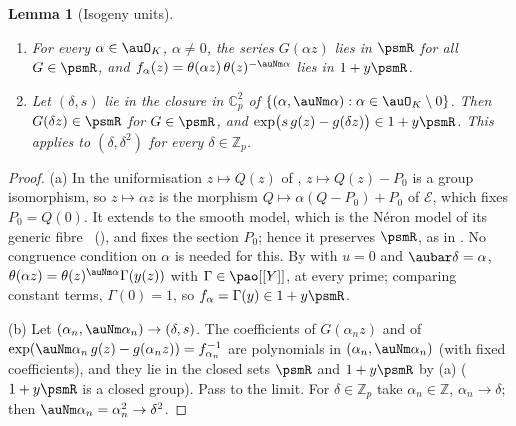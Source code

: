 \documentclass[10pt]{amsart}
\newtheorem{lemma}[theorem]{Lemma}
\theoremstyle{definition}
\theoremstyle{remark}
\newcommand{\C}{\mathbb C}
\newcommand{\Z}{\mathbb Z}
\begin{document}
\begin{lemma}[Isogeny units]\label{psm:units}
\begin{enumerate}
\item[(a)] For every $\alpha\in\auO_K$, $\alpha\ne0$, the series $G(\alpha z)$ lies in $\psmR$ for all
$G\in\psmR$, and $f_\alpha(z)=\theta(\alpha z)\,\theta(z)^{-\auNm\alpha}$ lies in $1+y\psmR$.
\item[(b)] Let $(\delta,s)$ lie in the closure in $\C_p^2$ of $\{(\alpha,\auNm\alpha):\alpha\in
\auO_K\setminus0\}$. Then $G(\delta z)\in\psmR$ for $G\in\psmR$, and $\exp\bigl(s\,g(z)-g(\delta
z)\bigr)\in1+y\psmR$. This applies to $(\delta,\delta^2)$ for every $\delta\in\Z_p$.
\end{enumerate}
\end{lemma}
\begin{proof}
(a) In the uniformisation $z\mapsto Q(z)$ of {\cite[\S7.2]{P49}}, $z\mapsto Q(z)-P_0$ is a group
isomorphism, so $z\mapsto\alpha z$ is the morphism $Q\mapsto\alpha(Q-P_0)+P_0$ of $\mathcal E$,
which fixes $P_0=Q(0)$. It extends to the smooth model, which is the N\'eron model of its generic
fibre~\cite[\S1.2, Definition~1, p.~12, and Proposition~8, p.~15]{BLR} (\cite[IV, Corollary~6.3, p.~329, and the N\'eron mapping property, p.~319]{SilvermanAT}), and fixes the section $P_0$; hence it preserves $\psmR$, as in
{\cite[(26)]{P49}}. No congruence condition on $\alpha$ is needed for this. By
{\cite[Proposition~7.6]{P49}} with $u=0$ and $\aubar\delta=\alpha$, $\theta(\alpha z)=\theta(z)^{
\auNm\alpha}\Gamma(y(z))$ with $\Gamma\in\pao[[Y]]$, at every prime; comparing constant terms,
$\Gamma(0)=1$, so $f_\alpha=\Gamma(y)\in1+y\psmR$.

(b) Let $(\alpha_n,\auNm\alpha_n)\to(\delta,s)$. The coefficients of $G(\alpha_nz)$ and of
$\exp(\auNm\alpha_n\,g(z)-g(\alpha_nz))=f_{\alpha_n}^{-1}$ are polynomials in $(\alpha_n,
\auNm\alpha_n)$ (with fixed coefficients), and they lie in the closed sets $\psmR$ and $1+y\psmR$
by (a) ($1+y\psmR$ is a closed group). Pass to the limit. For $\delta\in\Z_p$ take
$\alpha_n\in\Z$, $\alpha_n\to\delta$; then $\auNm\alpha_n=\alpha_n^2\to\delta^2$.
\end{proof}
\end{document}
